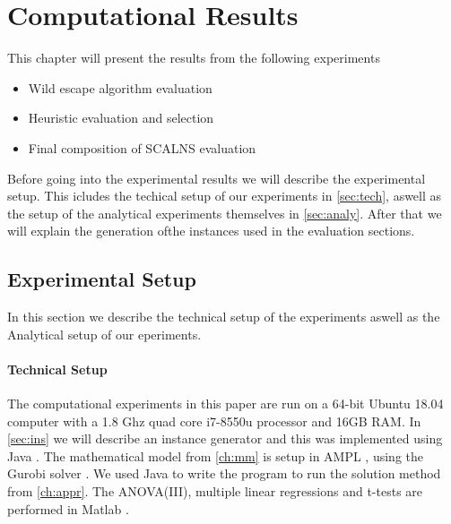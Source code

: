 \documentclass[../main.tex]{subfiles}
\begin{document}
                                                
\chapter{Computational Results}
\label{ch:res}
This chapter will present the results from the following experiments
\begin{itemize}
    \item Wild escape algorithm evaluation

    \item Heuristic evaluation and selection

    \item Final composition of SCALNS evaluation

\end{itemize}

Before going into the experimental results we will describe the experimental setup.
This icludes the techical setup of our experiments in \cref{sec:tech}, aswell as the setup of the analytical experiments themselves in \cref{sec:analy}.
After that we will explain the generation ofthe instances used in the evaluation sections.

\section{Experimental Setup}
\label{sec:setup}
In this section we describe the technical setup of the experiments aswell as the Analytical setup of our eperiments.
\subsubsection{Technical Setup}
The computational experiments in this paper are run on a 64-bit Ubuntu 18.04 computer with a 1.8 Ghz quad core i7-8550u processor and 16GB RAM. 
In \cref{sec:ins} we will describe an instance generator and this was implemented using Java \citep{java}.
The mathematical model from \cref{ch:mm} is setup in AMPL \citep{ampl}, using the Gurobi solver \citep{gurobi}.  
We used Java \citep{java} to write the program to run the solution method from \cref{ch:appr}.
The ANOVA(III), multiple linear regressions and t-tests are performed in Matlab \citep{matlab}.
\end{document}
